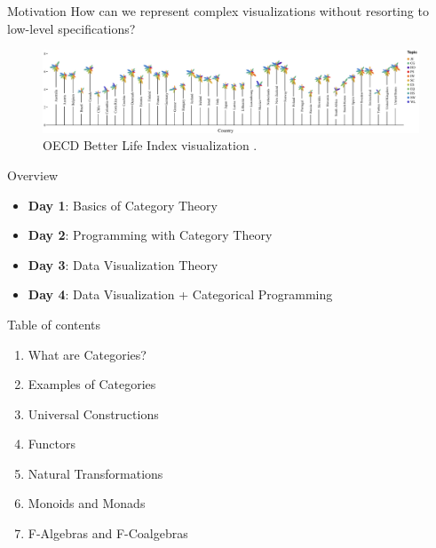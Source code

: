 \documentclass[aspectratio=169,xcolor=dvipsnames,10pt]{beamer}
\begin{document}
\begin{frame}[fragile]{Motivation}
    How can we represent complex visualizations without resorting to low-level specifications?
	\vspace{3mm}
	\begin{figure}[H]
		\begin{center}
			\includegraphics[width=1.\textwidth]{./figs/moritz.pdf}
		\end{center}
        \caption{OECD Better Life Index visualization \citet{oecd}.}
		\label{fig:rotated-histogram}
	\end{figure}
\end{frame}

\begin{frame}[fragile]{Overview}
    \begin{itemize}
        \item \textbf{Day 1}: Basics of Category Theory
        \item \textbf{Day 2}: Programming with Category Theory
        \item \textbf{Day 3}: Data Visualization Theory
        \item \textbf{Day 4}: Data Visualization + Categorical Programming
    \end{itemize}
\end{frame}

\begin{frame}{Table of contents}
    \begin{enumerate}
        \item What are Categories?
        \item Examples of Categories
        \item Universal Constructions
        \item Functors
        \item Natural Transformations
        \item Monoids and Monads
        \item F-Algebras and F-Coalgebras
    \end{enumerate}
\end{frame}
\end{document}
